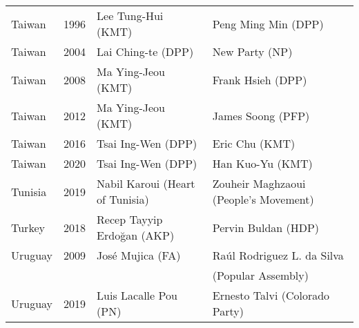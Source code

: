 {\begin{longtable}{|l|c|l|l|}
 Taiwan     & 1996 &   Lee Tung-Hui (KMT)       &   Peng Ming Min (DPP)\\ 
 Taiwan & 2004 &   Lai Ching-te (DPP) &   New Party (NP)      \\ 
 Taiwan & 2008 &   Ma Ying-Jeou (KMT)       &   Frank Hsieh (DPP)  \\ 
 Taiwan     & 2012 &  Ma Ying-Jeou (KMT)      &   James Soong (PFP)      \\ 
 Taiwan     & 2016 &   Tsai Ing-Wen (DPP) &  Eric Chu  (KMT)        \\ 
 Taiwan     & 2020 &   Tsai Ing-Wen (DPP) &  Han Kuo-Yu (KMT)      \\ 
 Tunisia     & 2019 & Nabil Karoui (Heart of Tunisia) & Zouheir Maghzaoui (People's Movement)  \\ 
 Turkey     & 2018 &   Recep Tayyip Erdo\u{g}an (AKP) &   Pervin Buldan (HDP)    \\ 
 Uruguay     & 2009 &   Jos\'e Mujica (FA)  &  Ra\'ul Rodriguez L. da Silva   \\ 
        &   &    &   (Popular Assembly) \\ 
 Uruguay     & 2019 &   Luis Lacalle Pou (PN)        &   Ernesto Talvi (Colorado Party)    \\ 
  \bottomrule 
\end{longtable} }